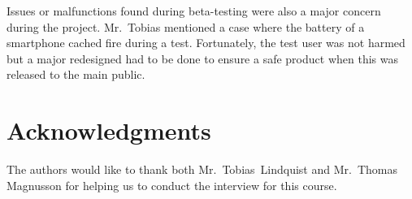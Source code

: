 \documentclass[journal]{IEEEtran}
\begin{document}
Issues or malfunctions found during beta-testing were also a major concern during the project. Mr.~Tobias mentioned a case where the battery of a smartphone cached fire during a test. Fortunately, the test user was not harmed but a major redesigned had to be done to ensure a safe product when this was released to the main public.

\section*{Acknowledgments}
The authors would like to thank both  Mr.~Tobias~Lindquist and Mr.~Thomas Magnusson for helping us to conduct the interview for this course.
\end{document}
